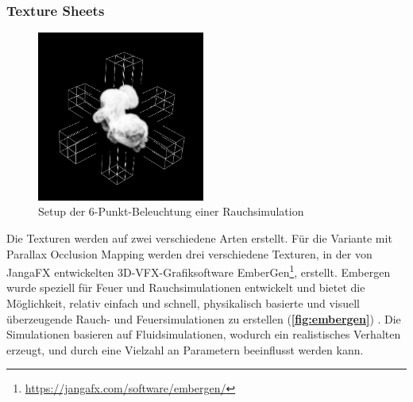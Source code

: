 \subsubsection{Texture Sheets}
\label{sec:4.2.1}
\begin{figure}[h!]
	\includegraphics[width=0.49\textwidth]{Grafiken/Implementation/Lightmaps/Smoke_LightSetup.png}
	\centering
	\begin{footnotesize}
		\caption{Setup der 6-Punkt-Beleuchtung einer Rauchsimulation}
		\label{fig:lightSetup}
	\end{footnotesize}
\end{figure}

Die Texturen werden auf zwei verschiedene Arten erstellt. Für die Variante mit Parallax Occlusion Mapping werden drei verschiedene
Texturen, in der von JangaFX entwickelten 3D-VFX-Grafiksoftware EmberGen\footnote{\url{https://jangafx.com/software/embergen/}}, erstellt.
Embergen wurde speziell für Feuer und Rauchsimulationen entwickelt und bietet die Möglichkeit, relativ einfach und schnell, physikalisch basierte und visuell
überzeugende Rauch- und Feuersimulationen zu erstellen (\textbf{\autoref{fig:embergen}}) .
Die Simulationen basieren auf Fluidsimulationen, wodurch ein realistisches Verhalten erzeugt, und durch eine Vielzahl an Parametern beeinflusst werden kann.

